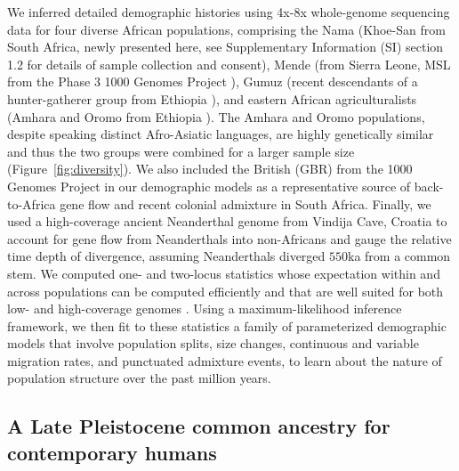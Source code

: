 \documentclass[]{article}
\begin{document}
We inferred detailed demographic histories using 4x-8x whole-genome sequencing
data for four diverse African populations, comprising the Nama (Khoe-San from
South Africa, newly presented here, see Supplementary Information (SI) section
1.2 for details of
sample collection and consent), Mende (from Sierra Leone, MSL from the
Phase 3 1000 Genomes Project \citep{1000_Genomes_Project_Consortium2015-zq}),
Gumuz (recent descendants of a hunter-gatherer group from Ethiopia
\citep{Gurdasani2015-qy,Gopalan2022-pw}), and eastern African agriculturalists
(Amhara and Oromo from Ethiopia \citep{Gurdasani2015-qy}). The Amhara and Oromo
populations, despite speaking distinct Afro-Asiatic languages, are highly
genetically similar \citep{Pagani2015-pz,Gopalan2022-pw} and thus the two
groups were combined for a larger sample size (Figure~\ref{fig:diversity}). We also
included the British (GBR) from the 1000 Genomes Project in our demographic
models as a representative source of back-to-Africa gene flow and recent
colonial admixture in South Africa. Finally, we used a high-coverage ancient
Neanderthal genome from Vindija Cave, Croatia \citep{Prufer2017-kk} to account
for gene flow from Neanderthals into non-Africans and gauge the relative
time depth of divergence, assuming Neanderthals diverged $550$ka from a common
stem. We computed one- and two-locus statistics whose expectation within and across 
populations can be computed efficiently and that are well suited for both low- and
high-coverage genomes \citep{Ragsdale2019-nt,Ragsdale2020-nz}. Using a
maximum-likelihood inference framework, we then fit to these statistics a
family of parameterized demographic models that involve population splits, size
changes, continuous and variable migration rates, and punctuated admixture
events, to learn about the nature of population structure over the past million
years.

  
\subsection*{A Late Pleistocene common ancestry for contemporary humans}
\end{document}
